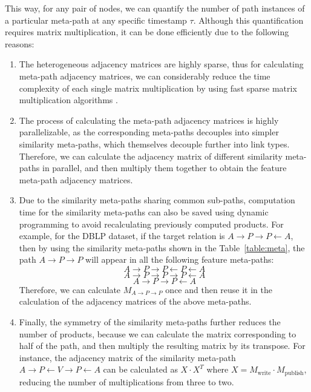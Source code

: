 This way, for any pair of nodes, we can quantify the number of path instances of a particular meta-path at any specific timestamp $\tau$. Although this quantification requires matrix multiplication, it can be done efficiently due to the following reasons:
\begin{enumerate}
\item The heterogeneous adjacency matrices are highly sparse, thus for calculating meta-path adjacency matrices, we can considerably reduce the time complexity of each single matrix multiplication by using fast sparse matrix multiplication algorithms \cite{horowitz1983fundamentals}.
\item The process of calculating the meta-path adjacency matrices is highly parallelizable, as the corresponding meta-paths decouples into simpler similarity meta-paths, which themselves decouple further into link types. Therefore, we can calculate the adjacency matrix of different similarity meta-paths in parallel, and then multiply them together to obtain the feature meta-path adjacency matrices.
\item Due to the similarity meta-paths sharing common sub-paths, computation time for the similarity meta-paths can also be saved using dynamic programming to avoid recalculating previously computed products. For example, for the DBLP dataset, if the target relation is $A\rightarrow P\rightarrow P\leftarrow A$, then by using the similarity meta-paths shown in the Table~\ref{table:meta}, the path $A\rightarrow P\rightarrow P$ will appear in all the following feature meta-paths:
\[A\rightarrow P\rightarrow P\leftarrow P\leftarrow A\]
\[A\rightarrow P\rightarrow P\rightarrow P\leftarrow A\]
\[A\rightarrow P\rightarrow P\leftarrow A\]
Therefore, we can calculate $M_{A\rightarrow P\rightarrow P}$ once and then reuse it in the calculation of the adjacency matrices of the above meta-paths.

\item Finally, the symmetry of the similarity meta-paths further reduces the number of products, because we can calculate the matrix corresponding to half of the path, and then multiply the resulting matrix by its transpose. For instance, the adjacency matrix of the similarity meta-path $A\rightarrow P\leftarrow V\rightarrow P\leftarrow A$ can be calculated as $X\cdot X^T$ where $X=M_{\text{write}}\cdot M_{\text{publish}}$, reducing the number of multiplications from three to two.
\end{enumerate}


